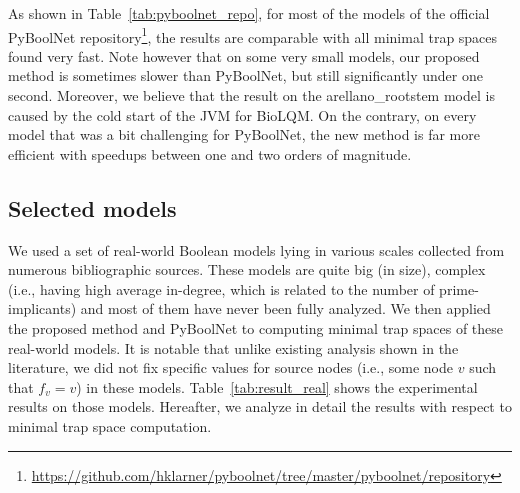 \documentclass[runningheads]{llncs}
\begin{document}
As shown in Table~\ref{tab:pyboolnet_repo}, for most of the models of the official PyBoolNet repository\footnote{\url{https://github.com/hklarner/pyboolnet/tree/master/pyboolnet/repository}}, the results are comparable with all minimal trap spaces found very fast.
Note however that on some very small models, our proposed method is sometimes slower than PyBoolNet, but still significantly under one second.
Moreover, we believe that the result on the arellano\_rootstem model is caused by the cold start of the JVM for BioLQM.\@
On the contrary, on every model that was a bit challenging for PyBoolNet, the new method is far more efficient with speedups between one and two orders of magnitude.

\subsection{Selected models}

We used a set of real-world Boolean models lying in various scales collected from numerous bibliographic sources.
These models are quite big (in size), complex (i.e., having high average in-degree, which is related to the number of prime-implicants) and most of them have never been fully analyzed.
We then applied the proposed method and PyBoolNet to computing minimal trap spaces of these real-world models.
It is notable that unlike existing analysis shown in the literature, we did not fix specific values for source nodes (i.e., some node \(v\) such that \(f_v = v\)) in these models.
Table~\ref{tab:result_real} shows the experimental results on those models. Hereafter, we analyze in detail the results with respect to minimal trap space computation.
\end{document}
